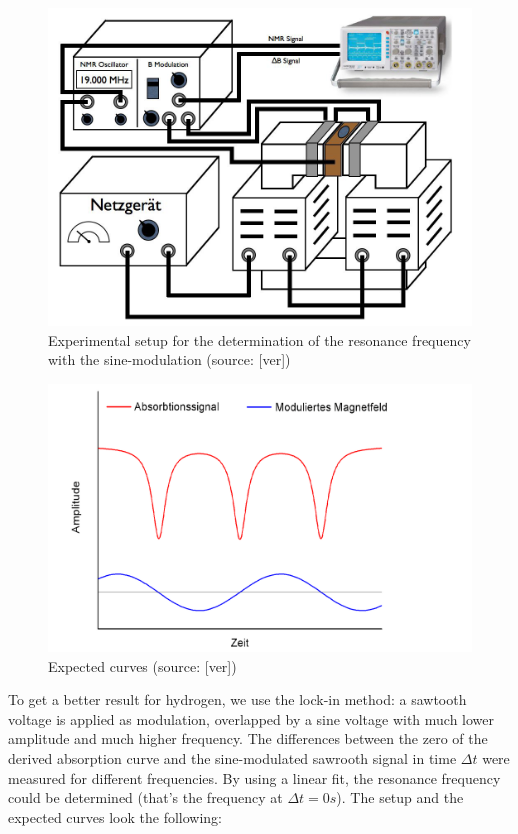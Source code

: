 \begin{figure}[htbp]
\begin{center}
\includegraphics [scale=0.5]{Bilder/teil234.png}
\caption{Experimental setup for the determination of the resonance frequency with the sine-modulation (source: [ver])}
\end{center}
\end{figure}
\begin{figure}[htbp]
\begin{center}
\includegraphics [scale=0.5]{Bilder/theoverlauf1.png}
\caption{Expected curves (source: [ver])}
\end{center}
\end{figure}
\clearpage
To get a better result for hydrogen, we use the lock-in method: a sawtooth voltage is applied as modulation, overlapped by a sine voltage with much lower amplitude and much higher frequency. The differences between the zero of the derived absorption curve and the sine-modulated sawrooth signal in time $\Delta t$ were measured for different frequencies. By using a linear fit, the resonance frequency could be determined (that's the frequency at $\Delta t=0s$). The setup and the expected curves look the following:\\
